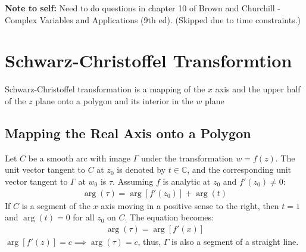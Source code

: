 \documentclass[12pt, english]{book}
\begin{document}
	{\color{Red} \textbf{Note to self:} Need to do questions in chapter 10 of Brown and Churchill - Complex Variables and Applications (9th ed). (Skipped due to time constraints.)}
	
	\chapter{Schwarz-Christoffel Transformtion} \label{Schwarz-Christoffel Transformation Chapter - Complex}
	
	Schwarz-Christoffel transformation is a mapping of the \(x\) axis and the upper half of the \(z\) plane onto a polygon and its interior in the \(w\) plane
	
	\section{Mapping the Real Axis onto a Polygon} \label{Mapping the Real Axis onto a Polygon Section - Complex}
	
	
	Let \(C\) be a smooth arc with image \(\Gamma\) under the transformation \(w = f(z)\). The unit vector tangent to \(C\) at \(z_0\) is denoted by \(t \in \mathbb{C}\), and the corresponding unit vector tangent to \(\Gamma\) at \(w_0\) is \(\tau\). Assuming \(f\) is analytic at \(z_0\) and \(f'(z_0) \neq 0 \):
	\begin{align*}
		\arg(\tau) = \arg[f'(z_0)] + \arg(t)
	\end{align*}
	If \(C\) is a segment of the \(x\) axis moving in a positive sense to the right, then \(t = 1\) and \(\arg(t) = 0\) for all \(z_0\) on \(C\). The equation becomes:
	\begin{align*}
		\arg(\tau) = \arg[f'(x)]
	\end{align*}
	\(\arg[f'(z)] = c \implies \arg(\tau) = c\), thus, \(\Gamma\) is also a segment of a straight line. 
	
\end{document}
